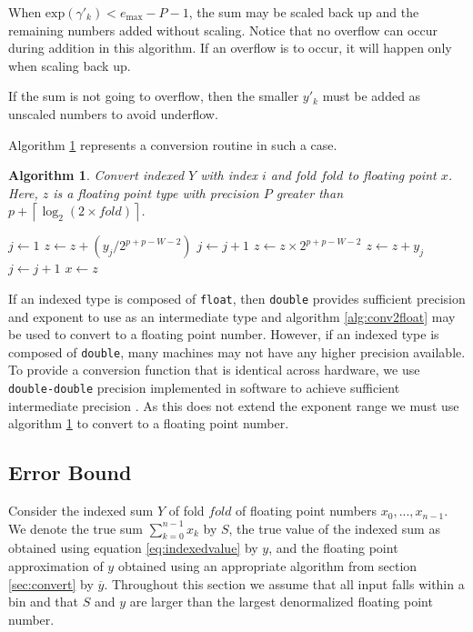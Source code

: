 \documentclass[12pt]{article}
\providecommand{\ceil}[1]{\left \lceil #1 \right \rceil }
\providecommand{\exp}{\ensuremath{\text{exp}}}
\providecommand{\max}{\ensuremath{\text{max}}}
\theoremstyle{plain}
\newtheorem{alg}{Algorithm}[section]
\begin{document}
  When $\exp(\gamma'_k) < e_{\max} - P - 1$, the sum may be scaled back up and the remaining numbers added without scaling. Notice that no overflow can occur during addition in this algorithm. If an overflow is to occur, it will happen only when scaling back up.

    If the sum is not going to overflow, then the smaller $y'_k$ must be added as unscaled numbers to avoid underflow.

    Algorithm \ref{alg:conv2floatoverflow} represents a conversion routine in such a case.

    \begin{alg}
      Convert indexed $Y$ with index $i$ and fold $fold$ to floating point $x$. Here, $z$ is a floating point type with precision $P$ greater than $p + \ceil{\log_2(2 \times fold)}$.
      \begin{algorithmic}
          \State $j \gets 1$
          \While{$j \leq 2 \times fold$ and $\exp(y_j) \geq e_{\max} - P - 1$}
            \State $z \gets z + (y_j / 2^{p + p - W - 2})$
            \State $j \gets j + 1$
          \EndWhile
          \State $z \gets z \times 2^{p + p - W - 2}$
            \State $z \gets z + y_j$
            \State $j \gets j + 1$
          \EndWhile
          \State $x \gets z$
        \EndFunction
      \end{algorithmic}
      \label{alg:conv2floatoverflow}
    \end{alg}

    If an indexed type is composed of \verb|float|, then \verb|double| provides sufficient precision and exponent to use as an intermediate type and algorithm \ref{alg:conv2float} may be used to convert to a floating point number.
    However, if an indexed type is composed of \verb|double|, many machines may not have any higher precision available. To provide a conversion function that is identical across hardware, we use \verb|double-double| precision implemented in software to achieve sufficient intermediate precision \cite{doubledouble}. As this does not extend the exponent range we must use algorithm \ref{alg:conv2floatoverflow} to convert to a floating point number.

  \subsection{Error Bound}
    Consider the indexed sum $Y$ of fold $fold$ of floating point numbers $x_0, ..., x_{n - 1}$. We denote the true sum $\sum \limits_{k = 0}^{n - 1} x_k$ by $S$, the true value of the indexed sum as obtained using equation \ref{eq:indexedvalue} by $y$, and the floating point approximation of $y$ obtained using an appropriate algorithm from section \ref{sec:convert} by $\overline{y}$.
    Throughout this section we assume that all input falls within a bin and that $S$ and $y$ are larger than the largest denormalized floating point number.
\end{document}
